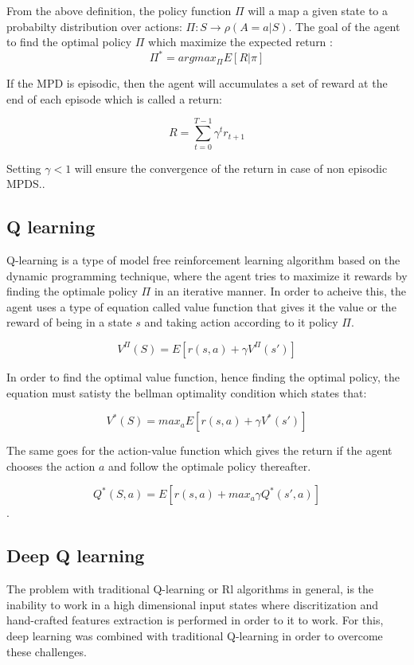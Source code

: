 \documentclass[12pt]{extarticle}
\begin{document}
\newpage
From the above definition, the policy function $\Pi$ will  a map a given state to a probabilty distribution over actions: $\Pi: S \longrightarrow \rho(A=a|S)$.
The goal of the agent to find the optimal policy $\Pi$ which maximize the expected return :\\
\[ \Pi^{*} = argmax_{\Pi}  E[R|\pi] \]

If the MPD is episodic, then the agent will accumulates a set of reward at the end of each episode which is called a return:

\[ R= \sum_{t=0}^{T-1} \gamma^{t}r_{t+1} \]

Setting $\gamma<1$ will ensure the convergence of the return in case of non episodic MPDS.\cite{arulkumaran2017brief}.

\subsection{Q learning}
Q-learning is a type of model free reinforcement learning algorithm  based on the dynamic programming technique, where the agent tries to maximize it rewards by finding the optimale policy $\Pi$ in an iterative manner. In order to  acheive this, the agent uses a type of equation called value function that gives it the value or the reward of being in a state $s$ and taking action according to it policy $\Pi$.


\[ V^{\Pi}(S)=E[r(s,a)+\gamma V^{\Pi}(s') ] \] 

In order to find the optimal value function, hence finding the optimal policy, the equation must satisty the bellman optimality condition which states that: 

  
\[ V^{*}(S)=max_{a}E[r(s,a)+\gamma V^{*}(s') ] \] 

The same goes for the action-value function which gives the return if the agent chooses the action $a$ and follow the optimale policy thereafter.

\[ Q^{*}(S,a)=E[r(s,a)+max_{a}\gamma Q^{*}(s',a) ] \]\cite{watkins1992q}.


\pagebreak

\subsection{Deep Q learning}
The problem with traditional Q-learning or Rl algorithms in general, is the inability to work in  a high dimensional input states where discritization and hand-crafted features extraction    is performed in order to it to work. For this, deep learning was combined with traditional Q-learning in order to overcome these challenges.\cite{mnih2013playing}
\end{document}
